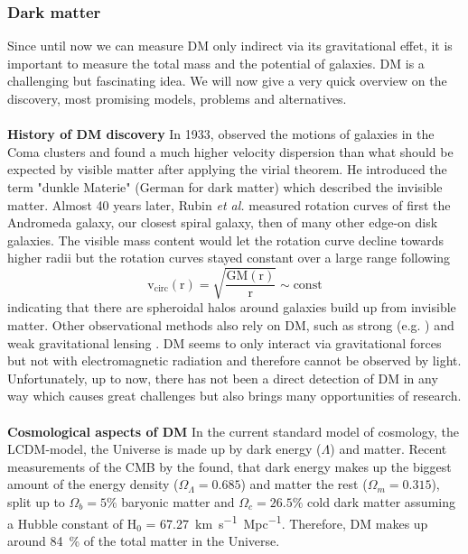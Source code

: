 \subsubsection{Dark matter}
Since until now we can measure \ac{DM} only indirect via its gravitational effet, it is important to measure the total mass and the potential of galaxies. \ac{DM} is a challenging but fascinating idea. We will now give a very quick overview on the discovery, most promising models, problems and alternatives. \\
\\\textbf{History of \ac{DM} discovery} In 1933, \citeauthor{Zwicky...DM...1933} observed the motions of galaxies in the Coma clusters and found a much higher velocity dispersion than what should be expected by visible matter after applying the virial theorem. He introduced the term "dunkle Materie" (German for dark matter) which described the invisible matter. Almost 40 years later, Rubin \textit{et al.} \citeyearpar{Rubin...DM...1970, Rubin...DM...1978, Rubin...DM...1980} measured rotation curves of first the Andromeda galaxy, our closest spiral galaxy, then of many other edge-on disk galaxies. The visible mass content would let the rotation curve decline towards higher radii but the rotation curves stayed constant over a large range following 
\begin{equation}\label{eq:circ_vel}
    \mathrm{v_{circ}(r)} = \sqrt{\frac{\mathrm{GM(r)}}{\mathrm{r}}} \sim \mathrm{const}
\end{equation}
indicating that there are spheroidal halos around galaxies build up from invisible matter. Other observational methods also rely on \ac{DM}, such as strong (e.g. \citep{Trick..stronglensing...2016}) and weak gravitational lensing \citep{Tyson...weaklensing...1990, Kaiser...weaklensing...1993}. \ac{DM} seems to only interact via gravitational forces but not with electromagnetic radiation and therefore cannot be observed by light. Unfortunately, up to now, there has not been a direct detection of \ac{DM} in any way which causes great challenges but also brings many opportunities of research.\\
\\\textbf{Cosmological aspects of \ac{DM}}
In the current standard model of cosmology, the \ac{LCDM}-model, the Universe is made up by dark energy ($\Lambda$) and matter. Recent measurements of the \ac{CMB} by the \citet{Planck...CMB...2018} found, that dark energy makes up the biggest amount of the energy density ($\Omega_\Lambda = 0.685$) and matter the rest ($\Omega_m = 0.315$), split up to $\Omega_b = 5\%$ baryonic matter and $\Omega_c = 26.5\%$ cold dark matter assuming a Hubble constant of H$_0$ =  \SI{67.27}{km.s^{-1}.Mpc^{-1}}. Therefore, \ac{DM} makes up around \SI{84}{\%} of the total matter in the Universe. \\
